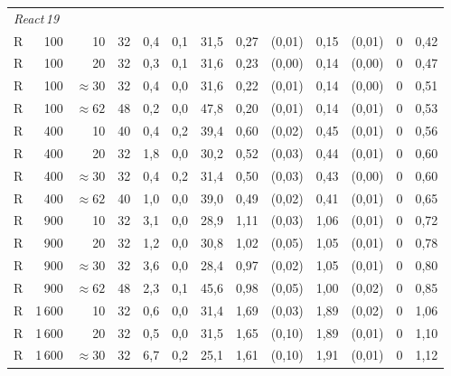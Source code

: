 \begin{landscape}
{\begin{longtable}{@{}l r r r  r r r  r r  r r  r r@{}}
\multicolumn{13}{l}{\textit{React\,19}} \\[2pt]
R &    100 & 10           &  32 &  0{,}4 & 0{,}1 &  31{,}5 &  0{,}27 & (0{,}01) &  0{,}15 & (0{,}01) &      0 & 0{,}42 \\
R &    100 & 20           &  32 &  0{,}3 & 0{,}1 &  31{,}6 &  0{,}23 & (0{,}00) &  0{,}14 & (0{,}00) &      0 & 0{,}47 \\
R &    100 & ${\approx}30$ &  32 &  0{,}4 & 0{,}0 &  31{,}6 &  0{,}22 & (0{,}01) &  0{,}14 & (0{,}00) &      0 & 0{,}51 \\
R &    100 & ${\approx}62$ &  48 &  0{,}2 & 0{,}0 &  47{,}8 &  0{,}20 & (0{,}01) &  0{,}14 & (0{,}01) &      0 & 0{,}53 \\
\midrule
R &    400 & 10           &  40 &  0{,}4 & 0{,}2 &  39{,}4 &  0{,}60 & (0{,}02) &  0{,}45 & (0{,}01) &      0 & 0{,}56 \\
R &    400 & 20           &  32 &  1{,}8 & 0{,}0 &  30{,}2 &  0{,}52 & (0{,}03) &  0{,}44 & (0{,}01) &      0 & 0{,}60 \\
R &    400 & ${\approx}30$ &  32 &  0{,}4 & 0{,}2 &  31{,}4 &  0{,}50 & (0{,}03) &  0{,}43 & (0{,}00) &      0 & 0{,}60 \\
R &    400 & ${\approx}62$ &  40 &  1{,}0 & 0{,}0 &  39{,}0 &  0{,}49 & (0{,}02) &  0{,}41 & (0{,}01) &      0 & 0{,}65 \\
\midrule
R &    900 & 10           &  32 &  3{,}1 & 0{,}0 &  28{,}9 &  1{,}11 & (0{,}03) &  1{,}06 & (0{,}01) &      0 & 0{,}72 \\
R &    900 & 20           &  32 &  1{,}2 & 0{,}0 &  30{,}8 &  1{,}02 & (0{,}05) &  1{,}05 & (0{,}01) &      0 & 0{,}78 \\
R &    900 & ${\approx}30$ &  32 &  3{,}6 & 0{,}0 &  28{,}4 &  0{,}97 & (0{,}02) &  1{,}05 & (0{,}01) &      0 & 0{,}80 \\
R &    900 & ${\approx}62$ &  48 &  2{,}3 & 0{,}1 &  45{,}6 &  0{,}98 & (0{,}05) &  1{,}00 & (0{,}02) &      0 & 0{,}85 \\
\midrule
R & 1\,600 & 10           &  32 &  0{,}6 & 0{,}0 &  31{,}4 &  1{,}69 & (0{,}03) &  1{,}89 & (0{,}02) &      0 & 1{,}06 \\
R & 1\,600 & 20           &  32 &  0{,}5 & 0{,}0 &  31{,}5 &  1{,}65 & (0{,}10) &  1{,}89 & (0{,}01) &      0 & 1{,}10 \\
R & 1\,600 & ${\approx}30$ &  32 &  6{,}7 & 0{,}2 &  25{,}1 &  1{,}61 & (0{,}10) &  1{,}91 & (0{,}01) &      0 & 1{,}12 \\

\end{longtable}}
\end{landscape}
